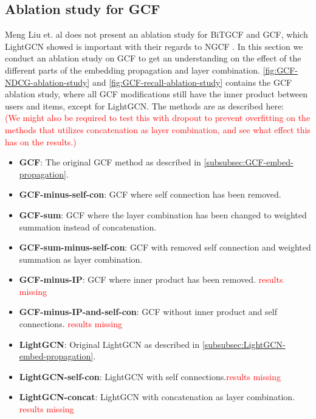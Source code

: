 \subsection{Ablation study for GCF}
Meng Liu et. al does not present an ablation study for BiTGCF and GCF, which LightGCN showed is important with their regards to NGCF \cite{lightgcn,BiTGCF}.
In this section we conduct an ablation study on GCF to get an understanding on the effect of the different parts of the embedding propagation and layer combination.
\autoref{fig:GCF-NDCG-ablation-study} and \autoref{fig:GCF-recall-ablation-study} contains the GCF ablation study, where all GCF modifications still have the inner product between users and items, except for LightGCN.
The methods are as described here:\\
\textcolor{red}{(We might also be required to test this with dropout to prevent overfitting on the methods that utilizes concatenation as layer combination, and see what effect this has on the results.)}
\begin{itemize}
    \item \textbf{GCF}: The original GCF method as described in \autoref{subsubsec:GCF-embed-propagation}.
    \item \textbf{GCF-minus-self-con}: GCF where self connection has been removed.
    \item \textbf{GCF-sum}: GCF where the layer combination has been changed to weighted summation instead of concatenation.
    \item \textbf{GCF-sum-minus-self-con}: GCF with removed self connection and weighted summation as layer combination.
    \item \textbf{GCF-minus-IP}: GCF where inner product has been removed. \textcolor{red}{results missing}
    \item \textbf{GCF-minus-IP-and-self-con}: GCF without inner product and self connections. \textcolor{red}{results missing}
    \item \textbf{LightGCN}: Original LightGCN as described in \autoref{subsubsec:LightGCN-embed-propagation}.
    \item \textbf{LightGCN-self-con}: LightGCN with self connections.\textcolor{red}{results missing}
    \item \textbf{LightGCN-concat}: LightGCN with concatenation as layer combination. \textcolor{red}{results missing}
\end{itemize}

